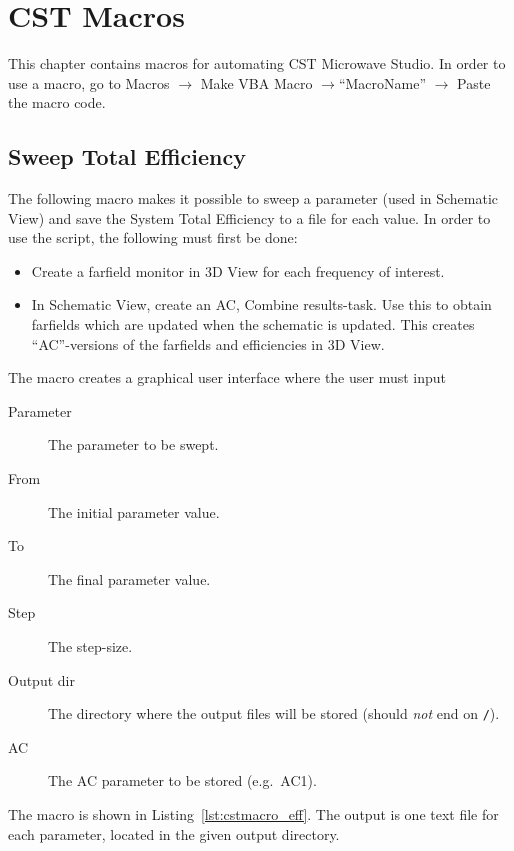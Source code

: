\chapter{CST Macros}
\label{cha:cstmacro}
\def\pil{$\rightarrow$\xspace}
This chapter contains macros for automating CST Microwave Studio. In order to use a macro, go to Macros \pil Make VBA Macro \pil ``MacroName'' \pil Paste the macro code.

\section{Sweep Total Efficiency}
The following macro makes it possible to sweep a parameter (used in Schematic View) and save the System Total Efficiency to a file for each value. In order to use the script, the following must first be done:
\begin{itemize}
    \item Create a farfield monitor in 3D View for each frequency of interest.
    \item In Schematic View, create an AC, Combine results-task. Use this to obtain farfields which are updated when the schematic is updated. This creates ``AC''-versions of the farfields and efficiencies in 3D View.
\end{itemize}
The macro creates a graphical user interface where the user must input
\begin{description}
    \item[Parameter] The parameter to be swept.
    \item[From] The initial parameter value.
    \item[To] The final parameter value.
    \item[Step] The step-size.
    \item[Output dir] The directory where the output files will be stored (should \emph{not} end on \texttt{/}).
    \item[AC] The AC parameter to be stored (e.g.\ AC1).
\end{description}
The macro is shown in Listing~\ref{lst:cstmacro_eff}. The output is one text file for each parameter, located in the given output directory.

